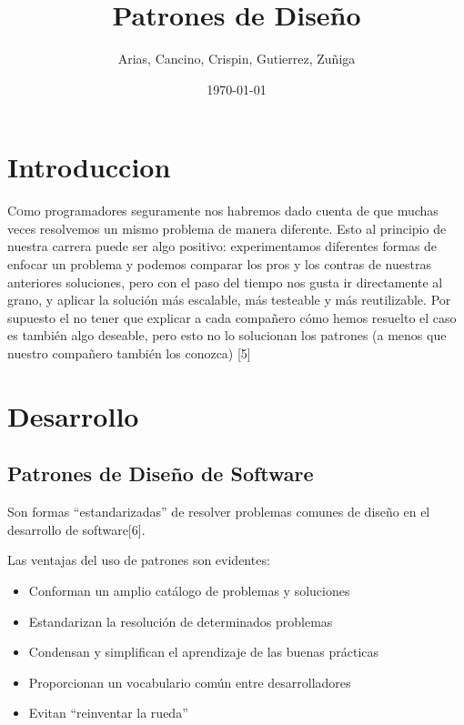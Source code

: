 \documentclass[twoside,twocolumn]{article}
\title{Patrones de Diseño} %
\author{Arias, Cancino, Crispin, Gutierrez, Zuñiga}
\date{\today} %
\begin{document}
\maketitle


\section{Introduccion}

\lettrine[nindent=0em,lines=3]{C}omo programadores seguramente nos habremos dado cuenta de que muchas veces resolvemos un mismo problema de manera diferente. Esto al principio de nuestra carrera puede ser algo positivo: experimentamos diferentes formas de enfocar un problema y podemos comparar los pros y los contras de nuestras anteriores soluciones, pero con el paso del tiempo nos gusta ir directamente al grano, y aplicar la solución más escalable, más testeable y más reutilizable. Por supuesto el no tener que explicar a cada compañero cómo hemos resuelto el caso es también algo deseable, pero esto no lo solucionan los patrones (a menos que nuestro compañero también los conozca) [5]
\section{Desarrollo}
\subsection{ Patrones de Diseño de Software}
Son formas “estandarizadas” de resolver problemas comunes de diseño en el desarrollo de software[6]. 

Las ventajas del uso de patrones son evidentes: 

\begin{itemize}
	\item Conforman un amplio catálogo de problemas y soluciones   
	\item Estandarizan la resolución de determinados problemas  
	\item Condensan y simplifican el aprendizaje de las buenas prácticas 
	\item Proporcionan un vocabulario común entre desarrolladores 
	\item Evitan “reinventar la rueda” 
\end{itemize}
\end{document}
